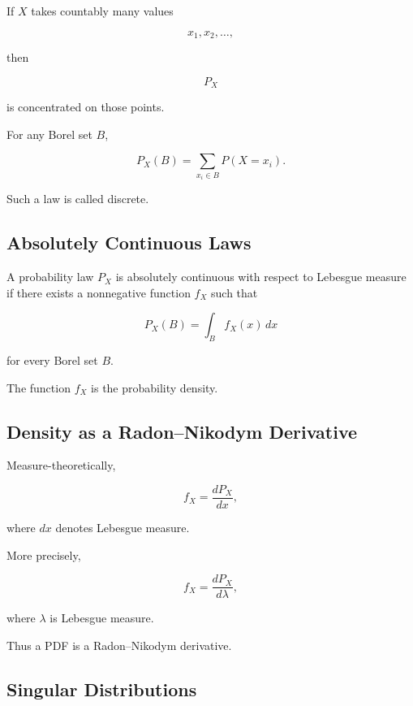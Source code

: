 If \(X\) takes countably many values

\[
x_1,x_2,\ldots,
\]

then

\[
P_X
\]

is concentrated on those points.

For any Borel set \(B\),

\[
\boxed{
P_X(B)
=
\sum_{x_i\in B}
P(X=x_i).
}
\]

Such a law is called discrete.

\subsection{Absolutely Continuous Laws}
\label{subsec:absolutely-continuous-laws}

A probability law \(P_X\) is absolutely continuous with respect to
Lebesgue measure if there exists a nonnegative function \(f_X\) such
that

\[
\boxed{
P_X(B)
=
\int_B
f_X(x)\,dx
}
\]

for every Borel set \(B\).

The function \(f_X\) is the probability density.

\subsection{Density as a Radon--Nikodym Derivative}
\label{subsec:density-radon-nikodym}

Measure-theoretically,

\[
\boxed{
f_X
=
\frac{dP_X}{dx},
}
\]

where \(dx\) denotes Lebesgue measure.

More precisely,

\[
\boxed{
f_X
=
\frac{dP_X}{d\lambda},
}
\]

where \(\lambda\) is Lebesgue measure.

Thus a PDF is a Radon--Nikodym derivative.

\subsection{Singular Distributions}
\label{subsec:singular-distributions}

